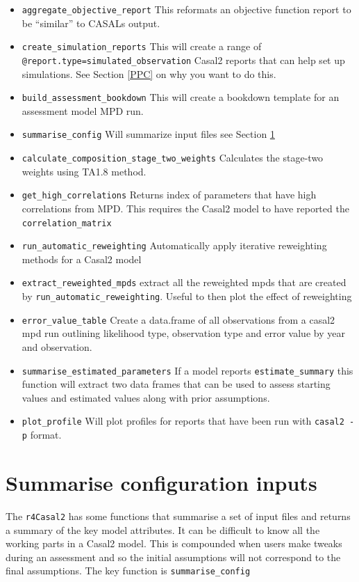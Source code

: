 \documentclass[
]{book}
\begin{document}
\begin{itemize}
\item
  \texttt{aggregate\_objective\_report} This reformats an objective function report to be ``similar'' to CASALs output.
\item
  \texttt{create\_simulation\_reports} This will create a range of \texttt{@report.type=simulated\_observation} Casal2 reports that can help set up simulations. See Section \ref{PPC} on why you want to do this.
\item
  \texttt{build\_assessment\_bookdown} This will create a bookdown template for an assessment model MPD run.
\item
  \texttt{summarise\_config} Will summarize input files see Section \ref{summariseinputs}
\item
  \texttt{calculate\_composition\_stage\_two\_weights} Calculates the stage-two weights using \citet{francis2011data} TA1.8 method.
\item
  \texttt{get\_high\_correlations} Returns index of parameters that have high correlations from MPD. This requires the Casal2 model to have reported the \texttt{correlation\_matrix}
\item
  \texttt{run\_automatic\_reweighting} Automatically apply iterative reweighting methods for a Casal2 model
\item
  \texttt{extract\_reweighted\_mpds} extract all the reweighted mpds that are created by \texttt{run\_automatic\_reweighting}. Useful to then plot the effect of reweighting
\item
  \texttt{error\_value\_table} Create a data.frame of all observations from a casal2 mpd run outlining likelihood type, observation type and error value by year and observation.
\item
  \texttt{summarise\_estimated\_parameters} If a model reports \texttt{estimate\_summary} this function will extract two data frames that can be used to assess starting values and estimated values along with prior assumptions.
\item
  \texttt{plot\_profile} Will plot profiles for reports that have been run with \texttt{casal2\ -p} format.
\end{itemize}

\hypertarget{summariseinputs}{%
\chapter{Summarise configuration inputs}\label{summariseinputs}}

The \texttt{r4Casal2} has some functions that summarise a set of input files and returns a summary of the key model attributes. It can be difficult to know all the working parts in a Casal2 model. This is compounded when users make tweaks during an assessment and so the initial assumptions will not correspond to the final assumptions. The key function is \texttt{summarise\_config}
\end{document}
